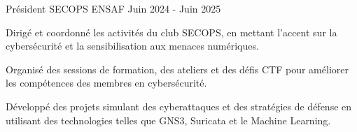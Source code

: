 
\begin{cventries}

  \cventry
    {Président} %
    {SECOPS} %
    {ENSAF} %
    {Juin 2024 - Juin 2025} %
    {
      \begin{cvitems} %
        \item {Dirigé et coordonné les activités du club SECOPS, en mettant l'accent sur la cybersécurité et la sensibilisation aux menaces numériques.}
        \item {Organisé des sessions de formation, des ateliers et des défis CTF pour améliorer les compétences des membres en cybersécurité.}
        \item {Développé des projets simulant des cyberattaques et des stratégies de défense en utilisant des technologies telles que GNS3, Suricata et le Machine Learning.}
      \end{cvitems}
    }

\end{cventries}
